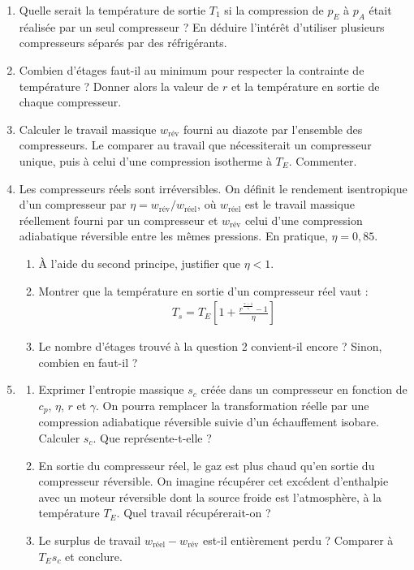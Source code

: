 \begin{enumerate}

	\item Quelle serait la température de sortie $T_1$ si la compression de $p_E$ à $p_A$ était réalisée par un seul compresseur ? En déduire l'intérêt d'utiliser plusieurs compresseurs séparés par des réfrigérants.

	\item Combien d'étages faut-il au minimum pour respecter la contrainte de température ? Donner alors la valeur de $r$ et la température en sortie de chaque compresseur.

	\item Calculer le travail massique $w_{\text{rév}}$ fourni au diazote par l'ensemble des compresseurs. Le comparer au travail que nécessiterait un compresseur unique, puis à celui d'une compression isotherme à $T_E$. Commenter.

	\item Les compresseurs réels sont irréversibles. On définit le rendement isentropique d'un compresseur par $\eta=w_{\text{rév}}/w_{\text{réel}}$, où $w_{\text{réel}}$ est le travail massique réellement fourni par un compresseur et $w_{\text{rév}}$ celui d'une compression adiabatique réversible entre les mêmes pressions. En pratique, $\eta=0{,}85$.
	\begin{enumerate}
		\item À l'aide du second principe, justifier que $\eta<1$.
		\item Montrer que la température en sortie d'un compresseur réel vaut :
		\begin{align*}
			T_s=T_E\left[1+\frac{r^{\frac{\gamma-1}{\gamma}}-1}{\eta}\right]
		\end{align*}
		\item Le nombre d'étages trouvé à la question 2 convient-il encore ? Sinon, combien en faut-il ?
	\end{enumerate}

	\item
	\begin{enumerate}
		\item Exprimer l'entropie massique $s_c$ créée dans un compresseur en fonction de $c_p$, $\eta$, $r$ et $\gamma$. On pourra remplacer la transformation réelle par une compression adiabatique réversible suivie d'un échauffement isobare. Calculer $s_c$. Que représente-t-elle ?
		\item En sortie du compresseur réel, le gaz est plus chaud qu'en sortie du compresseur réversible. On imagine récupérer cet excédent d'enthalpie avec un moteur réversible dont la source froide est l'atmosphère, à la température $T_E$. Quel travail récupérerait-on ?
		\item Le surplus de travail $w_{\text{réel}}-w_{\text{rév}}$ est-il entièrement perdu ? Comparer à $T_Es_c$ et conclure.
	\end{enumerate}

\end{enumerate}

